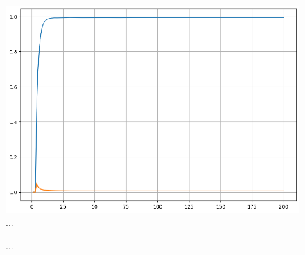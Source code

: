 \documentclass{article}
\begin{document}
	\begin{figure}[h]
		\centering
		\includegraphics[scale=0.45]{Two-P-20-Population-Competition-Area-Time-Both}
		\caption{...}
		\label{fig:Two-P-20-Population-Competition-Area-Time-Both}
	\end{figure}	

	\begin{figure}[h]
		\centering
		\qquad
		\caption{...}
		\label{fig:Two-P-21-Population-Competition-Time}
	\end{figure}	
\end{document}
